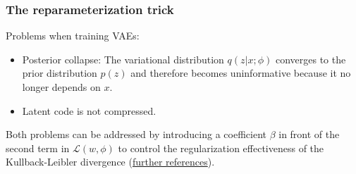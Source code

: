 \documentclass{beamer}
\begin{document}
\begin{frame}
    \frametitle{The reparameterization trick}
    Problems when training VAEs:
    \begin{itemize}
        \item Posterior collapse: The variational distribution $q(z|x;\phi)$ converges to the prior distribution $p(z)$ and therefore becomes uninformative because it no longer depends on $x$.
        \item Latent code is not compressed.
    \end{itemize}
    Both problems can be addressed by introducing a coefficient $\beta$ in front of the second term in $\mathcal{L}(w,\phi)$ to control the regularization effectiveness of the Kullback-Leibler divergence (\href{https://openreview.net/pdf?id=Sy2fzU9gl}{further references}).
\end{frame}
\end{document}
